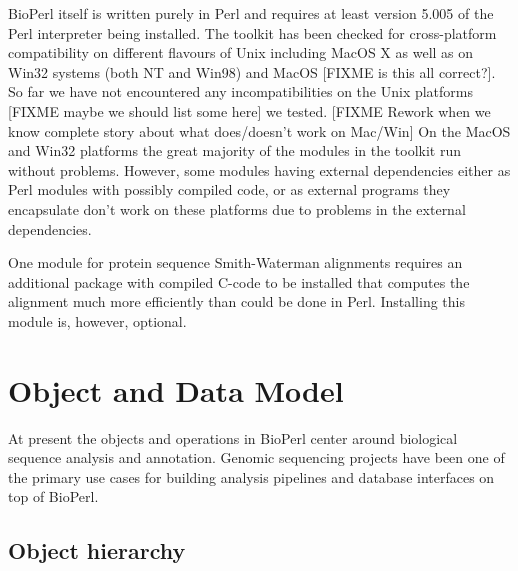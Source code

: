 \documentclass{article}
\begin{document}
\begin{twocolumn}
BioPerl itself is written purely in Perl and requires at least version
5.005 of the Perl interpreter being installed.  The toolkit has been
checked for cross-platform compatibility on different flavours of Unix
including MacOS X as well as on Win32 systems (both NT and Win98) and
MacOS [FIXME is this all correct?].  So far we have not encountered any
incompatibilities on the Unix platforms [FIXME maybe we should list
some here] we tested.  [FIXME Rework when we know complete story about
what does/doesn't work on Mac/Win] On the MacOS and Win32 platforms
the great majority of the modules in the toolkit run without
problems.  However, some modules having external dependencies either as
Perl modules with possibly compiled code, or as external programs they
encapsulate don't work on these platforms due to problems in the
external dependencies.

One module for protein sequence Smith-Waterman alignments requires an
additional package with compiled C-code to be installed that computes
the alignment much more efficiently than could be done in
Perl.  Installing this module is, however, optional.

\section{Object and Data Model}

At present the objects and operations in BioPerl center around
biological sequence analysis and annotation.  Genomic sequencing
projects have been one of the primary use cases for building analysis
pipelines and database interfaces on top of BioPerl. 

\subsection{Object hierarchy}


\end{twocolumn}
\end{document}
